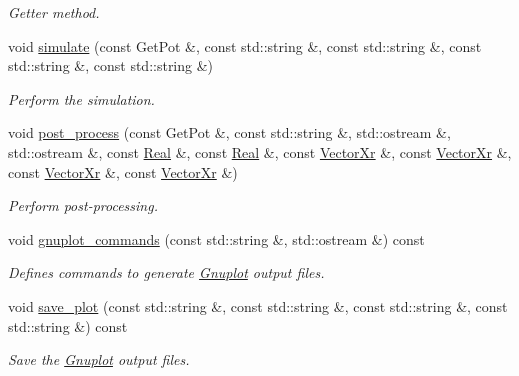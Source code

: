 \begin{DoxyCompactItemize}
\begin{DoxyCompactList}\small\item\em Getter method. \end{DoxyCompactList}\item 
void \hyperlink{classDosModel_a8c3fc92853bec19ee326ceaf3fb0dd9c}{simulate} (const Get\-Pot \&, const std\-::string \&, const std\-::string \&, const std\-::string \&, const std\-::string \&)
\begin{DoxyCompactList}\small\item\em Perform the simulation. \end{DoxyCompactList}\item 
void \hyperlink{classDosModel_a7c242ffcdb811bb6378ac14fa113c18f}{post\-\_\-process} (const Get\-Pot \&, const std\-::string \&, std\-::ostream \&, std\-::ostream \&, const \hyperlink{typedefs_8h_a060b837c3b4486ee35317744156f3da2}{Real} \&, const \hyperlink{typedefs_8h_a060b837c3b4486ee35317744156f3da2}{Real} \&, const \hyperlink{typedefs_8h_aae6cee78ed9cd8f234ed8cb48682548a}{Vector\-Xr} \&, const \hyperlink{typedefs_8h_aae6cee78ed9cd8f234ed8cb48682548a}{Vector\-Xr} \&, const \hyperlink{typedefs_8h_aae6cee78ed9cd8f234ed8cb48682548a}{Vector\-Xr} \&, const \hyperlink{typedefs_8h_aae6cee78ed9cd8f234ed8cb48682548a}{Vector\-Xr} \&)
\begin{DoxyCompactList}\small\item\em Perform post-\/processing. \end{DoxyCompactList}\item 
void \hyperlink{classDosModel_a26e64253688b5b51ffc54013bf3bc553}{gnuplot\-\_\-commands} (const std\-::string \&, std\-::ostream \&) const 
\begin{DoxyCompactList}\small\item\em Defines commands to generate \hyperlink{index_Gnuplot}{Gnuplot} output files. \end{DoxyCompactList}\item 
void \hyperlink{classDosModel_aa614583c066c644e83085beaad05279d}{save\-\_\-plot} (const std\-::string \&, const std\-::string \&, const std\-::string \&, const std\-::string \&) const 
\begin{DoxyCompactList}\small\item\em Save the \hyperlink{index_Gnuplot}{Gnuplot} output files. \end{DoxyCompactList}\end{DoxyCompactItemize}
